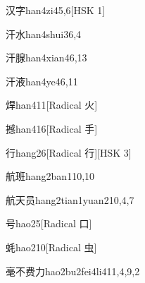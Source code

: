 \begin{entry}{汉字}{han4zi4}{5,6}[HSK 1]
\end{entry}

\begin{entry}{汗水}{han4shui3}{6,4}
\end{entry}

\begin{entry}{汗腺}{han4xian4}{6,13}
\end{entry}

\begin{entry}{汗液}{han4ye4}{6,11}
\end{entry}

\begin{entry}{焊}{han4}{11}[Radical 火]
\end{entry}

\begin{entry}{撼}{han4}{16}[Radical 手]
\end{entry}

\begin{entry}{行}{hang2}{6}[Radical 行][HSK 3]
\end{entry}

\begin{entry}{航班}{hang2ban1}{10,10}
\end{entry}

\begin{entry}{航天员}{hang2tian1yuan2}{10,4,7}
\end{entry}

\begin{entry}{号}{hao2}{5}[Radical 口]
\end{entry}

\begin{entry}{蚝}{hao2}{10}[Radical 虫]
\end{entry}

\begin{entry}{毫不费力}{hao2bu2fei4li4}{11,4,9,2}
\end{entry}

